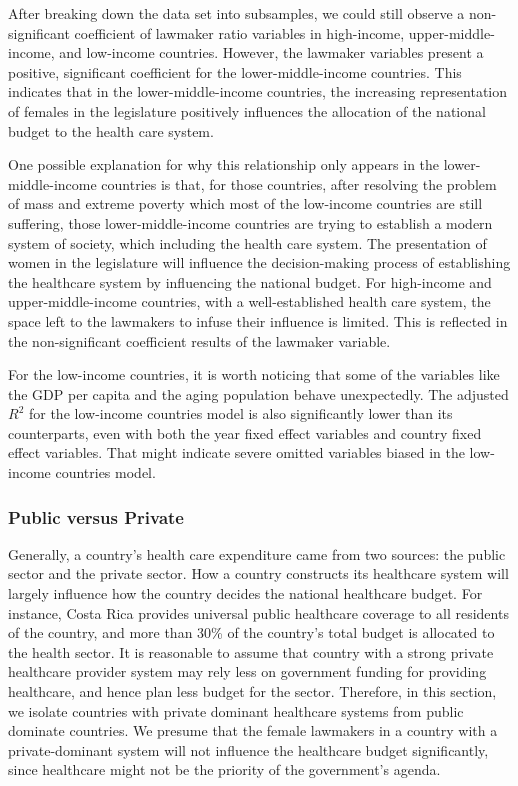 After breaking down the data set into subsamples, we could still observe a non-significant coefficient of lawmaker ratio variables in high-income, upper-middle-income, and low-income countries.
However, the lawmaker variables present a positive, significant coefficient for the lower-middle-income countries.
This indicates that in the lower-middle-income countries, the increasing representation of females in the legislature positively influences the allocation of the national budget to the health care system. 

One possible explanation for why this relationship only appears in the lower-middle-income countries is that, for those countries, after resolving the problem of mass and extreme poverty which most of the low-income countries are still suffering, those lower-middle-income countries are trying to establish a modern system of society, which including the health care system.
The presentation of women in the legislature will influence the decision-making process of establishing the healthcare system by influencing the national budget.
For high-income and upper-middle-income countries, with a well-established health care system, the space left to the lawmakers to infuse their influence is limited.
This is reflected in the non-significant coefficient results of the lawmaker variable. 

For the low-income countries, it is worth noticing that some of the variables like the GDP per capita and the aging population behave unexpectedly.
The adjusted $R^2$ for the low-income countries model is also significantly lower than its counterparts, even with both the year fixed effect variables and country fixed effect variables. 
That might indicate severe omitted variables biased in the low-income countries model. 

\subsubsection{Public versus Private}
Generally, a country's health care expenditure came from two sources: the public sector and the private sector.
How a country constructs its healthcare system will largely influence how the country decides the national healthcare budget.
For instance, Costa Rica provides universal public healthcare coverage to all residents of the country, and more than 30\% of the country's total budget is allocated to the health sector.
It is reasonable to assume that country with a strong private healthcare provider system may rely less on government funding for providing healthcare, and hence plan less budget for the sector.
Therefore, in this section, we isolate countries with private dominant healthcare systems from public dominate countries.
We presume that the female lawmakers in a country with a private-dominant system will not influence the healthcare budget significantly, since healthcare might not be the priority of the government's agenda.

